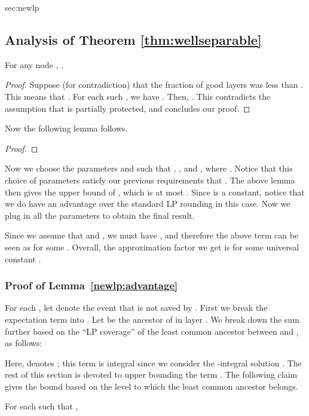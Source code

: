 \begin{appendixextra}{sec:newlp}{\subsection{Analysis of Theorem \ref{thm:wellseparable}}}
\begin{claim}
For any node , . 
\end{claim}

\begin{proof}
Suppose (for contradiction) that the fraction of good layers was less than . This means that .
For each such , we have .  
Then,
. 
This contradicts the assumption that  is partially protected, and concludes our proof.
\end{proof}

Now the following lemma follows.  

\newcommand{\qqqq}{\quad\quad\quad\quad}
\begin{lemma}
\label{lem:partial}  
 
\end{lemma}

\begin{proof} 

\end{proof} 
 
Now we choose the parameters  and  such that , , and , where .
Notice that this choice of parameters satisfy our previous requirements that . 
The above lemma then gives the upper bound of , which is at most .  
Since  is a constant, notice that we do have an advantage over the standard LP rounding in this case.
Now we plug in all the parameters to obtain the final result.   



Since we assume that  and , we must have ,
 and therefore the above term can be seen as  for some .
Overall, the approximation factor we get is  for some universal constant .  

\subsubsection{Proof of Lemma~\ref{newlp:advantage}}
For each , let  denote the event that  is not saved by .  
First we break the expectation term into .  
Let  be the ancestor of  in layer .  
We break down the sum further based on the ``LP coverage'' of the least common ancestor between  and , as follows: 


Here,  denotes ; this term is integral since we consider the -integral solution .  
The rest of this section is devoted to upper bounding the term . 
The following claim gives the bound based on the level  to which the least common ancestor belongs.

\begin{claim} 
\label{newlp:advantage:probpair}
For each  such that , 


\end{claim}
\end{appendixextra}
